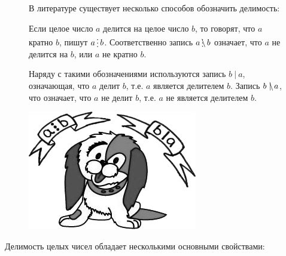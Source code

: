 
\begin{figure}[h]
\begin{minipage}{0.79\linewidth}\setlength{\parindent}{1.5em}
В литературе существует несколько способов обозначить делимость:

Если целое число $a$ делится на целое число $b$, то говорят, что $a$ кратно $b$, пишут $a\del b$. Соответственно запись $a\ndel b$ означает, что $a$ не делится на $b$, или $a$ не кратно $b$. 

Наряду с такими обозначениями используются запись $b~|~a$, означающая, что $a$ делит $b$, т.е. $a$ является делителем $b$. Запись $b~\mathrlap{\backslash}|~a$, что означает, что $a$ не делит $b$, т.е. $a$ не является делителем $b$.
\end{minipage}
\begin{minipage}{0.2\textwidth}
    \includegraphics[width=0.95\columnwidth]{./img/dog}
\end{minipage}
\end{figure}

Делимость целых чисел обладает несколькими основными свойствами:


